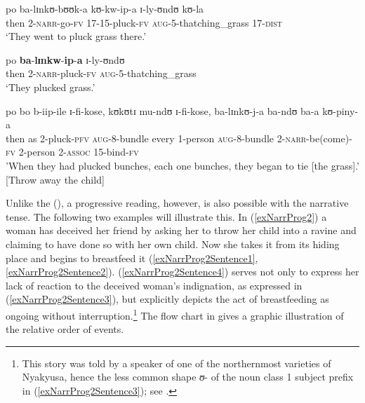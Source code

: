 \begin{exe}
\ex \label{exNARRactivitydelimited}
\begin{xlist}
\ex \gll po ba-lɪnkʊ-bʊʊk-a kʊ-kw-ip-a ɪ-ly-ʊndʊ kʊ-la\\
then 2-\textsc{narr}-go-\textsc{fv} 17-15-pluck-\textsc{fv} \textsc{aug}-5-thatching\_grass 17-\textsc{dist}\\
\glt \lq They went to pluck grass there.'

\ex \label{exNARRactivitydelimitedSentence2} \gll po \textbf{ba}-\textbf{lɪnkw}-\textbf{ip}-\textbf{a} ɪ-ly-ʊndʊ\\
then 2-\textsc{narr}-pluck-\textsc{fv} \textsc{aug}-5-thatching\_grass\\
\glt \lq They plucked grass.'

\ex \gll po bo b-iip-ile ɪ-fi-kose, kʊkʊtɪ mu-ndʊ ɪ-fi-kose, ba-lɪnkʊ-j-a ba-ndʊ ba-a kʊ-piny-a\\
then as 2-pluck-\textsc{pfv} \textsc{aug}-8-bundle every 1-person \textsc{aug}-8-bundle 2-\textsc{narr}-be(come)-\textsc{fv} 2-person 2-\textsc{assoc} 15-bind-\textsc{fv}\\
\largerpage
\glt 'When they had plucked bunches, each one bunches, they began to tie [the grass].' [Throw away the child]
\end{xlist}
\end{exe}

Unlike the  (), a progressive reading, however, is also possible with the narrative tense. The following two examples will illustrate this. In (\ref{exNarrProg2}) a woman has deceived her friend by asking her to throw her child into a ravine and claiming to have done so with her own child. Now she takes it from its hiding place and begins to breastfeed it (\ref{exNarrProg2Sentence1}, \ref{exNarrProg2Sentence2}). (\ref{exNarrProg2Sentence4}) serves not only to express her lack of reaction to the deceived woman's indignation, as expressed in (\ref{exNarrProg2Sentence3}), but explicitly depicts the act of breastfeeding as ongoing without interruption.\footnote{This story was told by a speaker of one of the northernmost varieties of Nyakyusa, hence the less common shape \textit{ʊ}- of the noun class 1 subject prefix in (\ref{exNarrProg2Sentence3}); see .} The flow chart in  gives a graphic illustration of the relative order of events.

